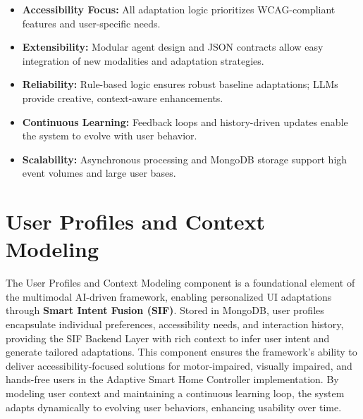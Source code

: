 \documentclass[openany]{book}
\begin{document}
\begin{itemize} \item \textbf{Accessibility Focus:} All adaptation logic prioritizes WCAG-compliant features and user-specific needs. \item \textbf{Extensibility:} Modular agent design and JSON contracts allow easy integration of new modalities and adaptation strategies. \item \textbf{Reliability:} Rule-based logic ensures robust baseline adaptations; LLMs provide creative, context-aware enhancements. \item \textbf{Continuous Learning:} Feedback loops and history-driven updates enable the system to evolve with user behavior. \item \textbf{Scalability:} Asynchronous processing and MongoDB storage support high event volumes and large user bases. \end{itemize}


\section{User Profiles and Context Modeling}
The User Profiles and Context Modeling component is a foundational element of the multimodal AI-driven framework, enabling personalized UI adaptations through \textbf{Smart Intent Fusion (SIF)}. Stored in MongoDB, user profiles encapsulate individual preferences, accessibility needs, and interaction history, providing the SIF Backend Layer with rich context to infer user intent and generate tailored adaptations. This component ensures the framework’s ability to deliver accessibility-focused solutions for motor-impaired, visually impaired, and hands-free users in the Adaptive Smart Home Controller implementation. By modeling user context and maintaining a continuous learning loop, the system adapts dynamically to evolving user behaviors, enhancing usability over time.
\end{document}
